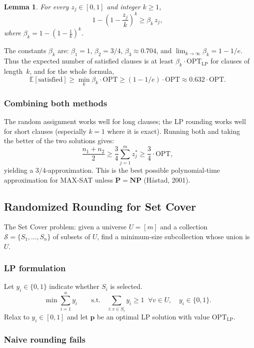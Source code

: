 \documentclass[twoside,12pt]{book}
\theoremstyle{plain}
\newtheorem{lemma}[theorem]{Lemma}
\theoremstyle{definition}
\theoremstyle{remark}
\begin{document}
\begin{lemma}
For every $z_j \in [0,1]$ and integer $k \ge 1$,
\[
1 - \left(1 - \frac{z_j}{k}\right)^k \ge \beta_k \, z_j,
\]
where $\beta_k = 1 - \left(1 - \frac{1}{k}\right)^k$.
\end{lemma}

The constants $\beta_k$ are: $\beta_1 = 1$, $\beta_2 = 3/4$,
$\beta_3 \approx 0.704$, and $\lim_{k\to\infty} \beta_k = 1 - 1/e$.
Thus the expected number of satisfied clauses is at least
$\beta_k \cdot \text{OPT}_{\text{LP}}$ for clauses of length~$k$,
and for the whole formula,
\[
\mathbb{E}[\text{satisfied}] \ge \min_k \beta_k \cdot \text{OPT}
\ge (1 - 1/e) \cdot \text{OPT} \approx 0.632 \cdot \text{OPT}.
\]

\subsubsection*{Combining both methods}

The random assignment works well for long clauses; the LP rounding
works well for short clauses (especially $k=1$ where it is
exact).  Running both and taking the better of the two solutions
gives:
\[
\frac{n_1 + n_2}{2} \ge \frac{3}{4} \sum_{j=1}^m z_j^*
\ge \frac{3}{4} \cdot \text{OPT},
\]
yielding a $3/4$-approximation.  This is the best possible
polynomial-time approximation for MAX-SAT unless
$\mathbf{P} = \mathbf{NP}$ (H\aa stad, 2001).

\subsection{Randomized Rounding for Set Cover}

The Set Cover problem: given a universe $U = [m]$ and a collection
$\mathcal{S} = \{S_1,\ldots,S_n\}$ of subsets of $U$, find a minimum-size
subcollection whose union is $U$.

\subsubsection*{LP formulation}

Let $y_i \in \{0,1\}$ indicate whether $S_i$ is selected.
\[
\min \sum_{i=1}^n y_i
\qquad
\text{s.t.}\quad
\sum_{i: v \in S_i} y_i \ge 1\;\; \forall v \in U,
\quad y_i \in \{0,1\}.
\]
Relax to $y_i \in [0,1]$ and let $\mathbf{p}$ be an optimal LP
solution with value $\text{OPT}_{\text{LP}}$.

\subsubsection*{Naive rounding fails}
\end{document}

